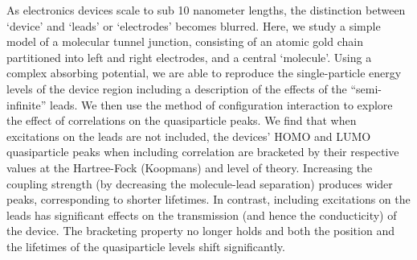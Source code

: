 As electronics devices scale to sub 10 nanometer lengths, the distinction
between `device' and `leads' or `electrodes' becomes blurred.
Here, we study a simple model of a molecular tunnel junction, consisting
of an atomic gold chain partitioned into left and right electrodes, and a
central `molecule'.
Using a complex absorbing potential, we are able to reproduce the
single-particle energy levels of the device region including a description
of the effects of the ``semi-infinite'' leads.
We then use the method of configuration interaction to explore the effect
of correlations on the quasiparticle peaks.
We find that when excitations on the leads are not included, the devices'
\ac{HOMO} and \ac{LUMO} quasiparticle peaks when including correlation
are bracketed by their respective values at the Hartree-Fock (Koopmans)
and \dscf level of theory.
Increasing the coupling strength (by decreasing the molecule-lead
separation) produces wider peaks, corresponding to shorter lifetimes.
In contrast, including excitations on the leads has significant effects
on the transmission (and hence the conducticity) of the device. The
bracketing property no longer holds and both the position and the lifetimes
of the quasiparticle levels shift significantly.
